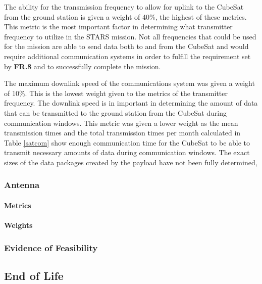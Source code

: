 \documentclass[3p]{elsarticle}
\begin{document}
The ability for the transmission frequency to allow for uplink to the CubeSat from the ground station is given a weight of 40\%, the highest of these metrics. This metric is the most important factor in determining what transmitter frequency to utilize in the STARS mission. Not all frequencies that could be used for the mission are able to send data both to and from the CubeSat and would require additional communication systems in order to fulfill the requirement set by \textbf{FR.8} and to successfully complete the mission. 

The maximum downlink speed of the communications system was given a weight of 10\%. This is the lowest weight given to the metrics of the transmitter frequency. The downlink speed is in important in determining the amount of data that can be transmitted to the ground station from the CubeSat during communication windows. This metric was given a lower weight as the mean transmission times and the total transmission times per month calculated in Table \ref{satcom} show enough communication time for the CubeSat to be able to transmit necessary amounts of data during communication windows. The exact sizes of the data packages created by the payload have not been fully determined, 

\subsubsection{Antenna}
\paragraph{Metrics}
\paragraph{Weights}
\subsubsection{Evidence of Feasibility}

\subsection{End of Life}
\end{document}
